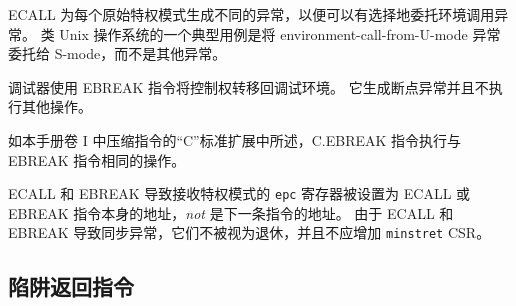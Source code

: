 {\iffalse
\begin{commentary}
ECALL generates a different exception for each originating privilege mode
so that environment call exceptions can be selectively delegated.  A typical
use case for Unix-like operating systems is to delegate to S-mode the
environment-call-from-U-mode exception but not the others.
\end{commentary}
\fi
\begin{commentary}
ECALL 为每个原始特权模式生成不同的异常，以便可以有选择地委托环境调用异常。 类 Unix 操作系统的一个典型用例是将 environment-call-from-U-mode 异常委托给 S-mode，而不是其他异常。
\end{commentary}

\iffalse
The EBREAK instruction is used by debuggers to cause control to be transferred
back to a debugging environment.  It generates a breakpoint exception and
performs no other operation.
\fi
调试器使用 EBREAK 指令将控制权转移回调试环境。 它生成断点异常并且不执行其他操作。

\iffalse
\begin{commentary}
As described in the ``C'' Standard Extension for Compressed Instructions in
Volume I of this manual, the C.EBREAK instruction performs the same operation
as the EBREAK instruction.
\end{commentary}
\fi
\begin{commentary}
如本手册卷 I 中压缩指令的“C”标准扩展中所述，C.EBREAK 指令执行与 EBREAK 指令相同的操作。
\end{commentary}

\iffalse
ECALL and EBREAK cause the receiving privilege mode's {\tt epc} register
to be set to the address of the ECALL or EBREAK instruction itself, {\em not}
the address of the following instruction.
As ECALL and EBREAK cause synchronous exceptions, they are not considered to
retire, and should not increment the {\tt minstret} CSR.
\fi
ECALL 和 EBREAK 导致接收特权模式的 {\tt epc} 寄存器被设置为 ECALL 或 EBREAK 指令本身的地址，{\em not} 是下一条指令的地址。
由于 ECALL 和 EBREAK 导致同步异常，它们不被视为退休，并且不应增加 {\tt minstret} CSR。

\subsection{陷阱返回指令}
\label{otherpriv}

}
